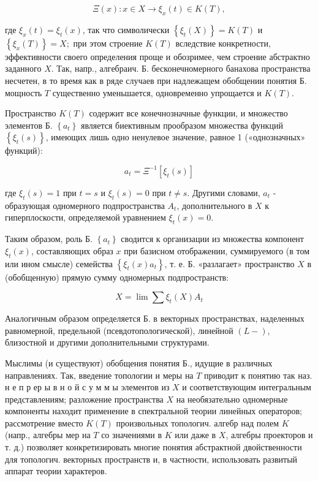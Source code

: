 \documentclass[10pt]{article}
\begin{document}
\[

\Xi(x): x \in X \longrightarrow \xi_{x}(t) \in K(T),

\]



где $\xi_{x}(t)=\xi_{t}(x)$, так что символически $\left\{\xi_{t}(X)\right\}=K(T)$ и $\left\{\xi_{x}(T)\right\}=X ;$ при этом строение $K(T)$ вследствие конкретности, эффективности своего определения проще и обозримее, чем строение абстрактно заданного $X$. Так, напр., алгебраич. Б. бесконечномерного банахова пространства несчетен, в то время как в ряде случаев при надлежащем обобщении понятия Б. мощность $T$ существенно уменьшается, одновременно упрощается и $K(T)$.



Пространство $K(T)$ содержит все конечнозначные функции, и множество элементов Б. $\left\{a_{t}\right\}$ является биективным прообразом множества функций $\left\{\xi_{t}(s)\right\}$, имеющих лишь одно ненулевое значение, равное 1 («однозначных» функций):



\[

a_{t}=\Xi^{-1}\left[\xi_{t}(s)\right]

\]



где $\xi_{t}(s)=1$ при $t=s$ и $\xi_{t}(s)=0$ при $t \neq s$. Другими словами, $a_{t}$ - образующая одномерного подпространства $A_{t}$, дополнительного в $X$ к гиперплоскости, определяемой уравнением $\xi_{t}(x)=0$.



Таким образом, роль Б. $\left\{a_{t}\right\}$ сводится к организации из множества компонент $\xi_{t}(x)$, составляющих образ $x$ при базисном отображении, суммируемого (в том или ином смысле) семейства $\left\{\xi_{t}(x) a_{t}\right\}$, т. е. Б. «разлагает» пространство $X$ в (обобщенную) прямую сумму одномерных подпространств:



\[

X=\lim \sum \xi_{t}(X) A_{t}

\]



Аналогичным образом определяется Б. в векторных пространствах, наделенных равномерной, предельной (псевдотопологической), линейной $(L-)$, близостной и другими дополнительными структурами.



Мыслимы (и существуют) обобщения понятия Б., идущие в различных направлениях. Так, введение топологии и меры на $T$ приводит к понятию так наз. н е п р ер ы в н о й с у м м ы элементов из $X$ и соответствующим интегральным представлениям; разложение пространства $X$ на необязательно одномерные компоненты находит применение в спектральной теории линейных операторов; рассмотрение вместо $K(T)$ произвольных топологич. алгебр над полем $K$ (напр., алгебры мер на $T$ со значениями в $K$ или даже в $X$, алгебры проекторов и т. д.) позволяет конкретизировать многие понятия абстрактной двойственности для топологич. векторных пространств и, в частности, использовать развитый аппарат теории характеров.
\end{document}
